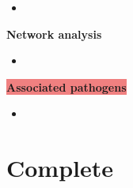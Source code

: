 \documentclass[11pt]{article}
\newcommand{\highlightoptional}[1]{\colorbox{lightorange}{#1}}  %
\newcommand{\highlightrobust}[1]{\colorbox{lightcoral}{#1}}  %
\begin{document}
	\begin{itemize}
		\item 
	\end{itemize}
\par\noindent\hspace{1cm}\highlightoptional{\textbf{\large Network analysis}}  %
	\begin{itemize}
		\item 
	\end{itemize}
\par\noindent\hspace{1cm}\highlightrobust{\textbf{\large Associated pathogens}}  %
	\begin{itemize}
		\item 
	\end{itemize}

		
		
	
	
	
\section{Complete} 
\end{document}
